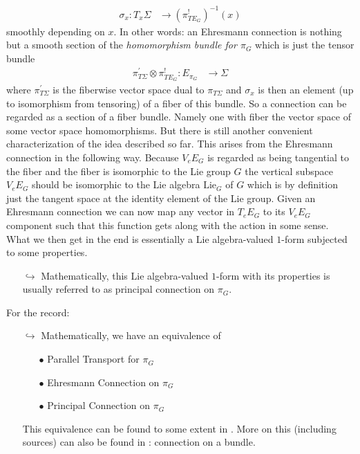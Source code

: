 \begin{enumerate}
\begin{align*}
  \sigma_{x}
  \colon
  T_{x}\Sigma
  &\rightarrow
  \left(
    \pi_{TE_{G}}^{!}
  \right)^{-1}
  (x)
\end{align*}
smoothly depending on $x$. In other words: an Ehresmann connection is nothing but a smooth section of the \textit{homomorphism bundle for $\pi_{G}$} which is just the tensor bundle
\begin{align*}
  \pi_{T\Sigma}^{\prime}
  \otimes
  \pi_{TE_{G}}^{!}
  \colon
  E_{\pi_{G}}
  &\rightarrow
  \Sigma
\end{align*}
where $\pi_{T\Sigma}^{\prime}$ is the fiberwise vector space dual to $\pi_{T\Sigma}$ and $\sigma_{x}$ is then an element (up to isomorphism from tensoring) of a fiber of this bundle. So a connection can be regarded as a section of a fiber bundle. Namely one with fiber the vector space of some vector space homomorphisms. But there is still another convenient characterization of the idea described so far. This arises from the Ehresmann connection in the following way. Because $V_{e}E_{G}$ is regarded as being tangential to the fiber and the fiber is isomorphic to the Lie group $G$ the vertical subspace $V_{e}E_{G}$ should be isomorphic to the Lie algebra $\mathrm{Lie}_{G}$ of $G$ which is by definition just the tangent space at the identity element of the Lie group. Given an Ehresmann connection we can now map any vector in $T_{e}E_{G}$ to its $V_{e}E_{G}$ component such that this function gets along with the action in some sense. What we then get in the end is essentially a Lie algebra-valued $1$-form subjected to some properties.
\begin{enumerate}
\item[$\pmb{\hookrightarrow}$]
Mathematically, this Lie algebra-valued $1$-form with its properties is usually referred to as principal connection on $\pi_{G}$.
\end{enumerate}
For the record:
\begin{enumerate}
\item[$\pmb{\hookrightarrow}$]
Mathematically, we have an equivalence of
\begin{enumerate}
\item[$\bullet$]
Parallel Transport for $\pi_{G}$
\item[$\bullet$]
Ehresmann Connection on $\pi_{G}$
\item[$\bullet$]
Principal Connection on $\pi_{G}$
\end{enumerate}
This equivalence can be found to some extent in \cite{797789bc}. More on this (including sources) can also be found in \cite{wiki-nlab0000}: connection on a bundle.

\end{enumerate}
\end{enumerate}
